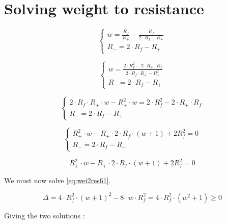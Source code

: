 \label{ap:other}

\section{Solving weight to resistance}\label{apsec:wei2res}

\begin{equation}\label{eq:wei2res3}
  \begin{cases}
    w=\frac{R_f}{R_+}-\frac{R_f}{2\cdot R_f -R_+}\\
    R_-=2\cdot R_f -R_+
  \end{cases}
\end{equation}


\begin{equation}\label{eq:wei2res4}
  \begin{cases}
    w=\frac{2\cdot R_f^2-2\cdot R_+\cdot R_f}{2\cdot R_f\cdot R_+ -R_+^2}\\
    R_-=2\cdot R_f -R_+
  \end{cases}
\end{equation}

\begin{equation}\label{eq:wei2res5}
  \begin{cases}
    2\cdot R_f\cdot R_+\cdot w -R_+^2\cdot w=2\cdot R_f^2-2\cdot R_+\cdot R_f\\
    R_-=2\cdot R_f -R_+
  \end{cases}
\end{equation}

\begin{equation}\label{eq:wei2res6}
  \begin{cases}
    R_+^2\cdot w - R_+\cdot 2\cdot R_f \cdot(w+1) + 2R_f^2 = 0\\
    R_-=2\cdot R_f -R_+
  \end{cases}
\end{equation}

\begin{equation}\label{eq:wei2res61}
  R_+^2\cdot w - R_+\cdot 2\cdot R_f \cdot(w+1) + 2R_f^2 = 0
\end{equation}

We must now solve \cref{eq:wei2res61}.

\begin{equation}\label{eq:wei2res61}
  \Delta = 4\cdot R_f^2\cdot(w+1)^2-8\cdot w\cdot R_f^2 = 4\cdot R_f^2\cdot(w^2+1) \ge 0
\end{equation}

Giving the two solutions :


